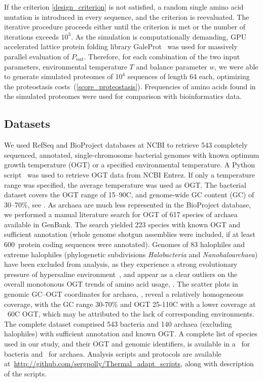 \documentclass[10pt,letterpaper]{article}
\newcommand{\PROTEINLIMIT}{600}
\begin{document}
If the criterion \eqref{design_criterion} is not satisfied,  a random single amino acid mutation is introduced in every sequence, and the criterion is reevaluated. The iterative procedure proceeds either until the criterion is met or the number of iterations exceeds $10^{3}$. As the simulation is computationally demanding, GPU accelerated lattice protein folding library GaleProt~\cite{Venev2015Massively} was used for massively parallel evaluation of $P_{nat}$. Therefore, for each combination of the two input parameters, environmental temperature $T$ and balance parameter $w$, we were able to generate simulated proteomes of $10^4$ sequences of length 64 each, optimizing the proteostasis costs~(\ref{score_proteostasis}). Frequencies of amino acids found in the simulated proteomes were used for comparison with bioinformatics data.


\subsection*{Datasets}
We used  RefSeq and BioProject databases at NCBI to retrieve 543 completely sequenced, annotated, single-chromosome bacterial genomes with known optimum growth temperature (OGT) or a specified environmental temperature. A Python script~\cite{Cock2009Biopython} was used to retrieve OGT data from NCBI Entrez. If only a temperature range was specified, the average temperature was used as OGT. The bacterial dataset covers the OGT range of 15--90\textdegree C, and genome-wide GC content (GC) of 30--70\%, see .
As archaea are much less represented in the BioProject database, we performed a manual literature search for OGT of 617 species of archaea available in GenBank. The search yielded 223 species with known OGT and sufficient annotation (whole genome shotgun assemblies were included, if at least \PROTEINLIMIT \ protein coding sequences were annotated). Genomes of 83 halophiles and extreme halophiles (phylogenetic subdivisions {\it Halobacteria} and {\it Nanohaloarchaea}) have been excluded from analysis, as they experience a strong evolutionary pressure of hypersaline environment~\cite{Fukuchi2003Unique}, and appear as a clear outliers on the overall monotonous OGT trends of amino acid usage,  . The scatter plots in genomic GC--OGT coordinates for archaea, , reveal a relatively homogeneous coverage, with the GC range 30-70\% and OGT 25-110\textdegree C with a lower coverage at ~60\textdegree C OGT, which may be attributed to the lack of corresponding environments.  The complete dataset comprised 543 bacteria and 140 archaea (excluding halophiles) with sufficient annotation and known OGT. A complete list of species used in our study, and their OGT and genomic identifiers, is available in a~ for bacteria and~ for archaea. Analysis scripts and protocols are available at~\url{http://github.com/sergpolly/Thermal_adapt_scripts}, along with description of the scripts.
\end{document}
